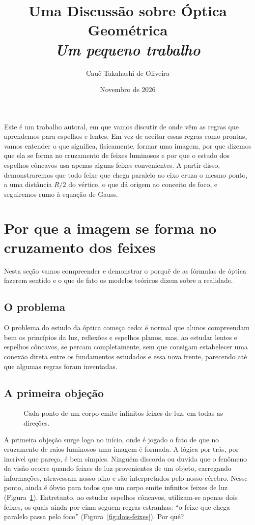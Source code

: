 \documentclass[11pt,a4paper]{article}
\title{\textbf{Uma Discussão sobre Óptica Geométrica}\\[11pt]
  {\large\itshape Um pequeno trabalho}}
\author{Cauê Takahashi de Oliveira}
\date{Novembro de 2026}
\begin{document}
\maketitle
\thispagestyle{empty}

Este é um trabalho autoral, em que vamos discutir de onde vêm as regras que
aprendemos para espelhos e lentes. Em vez de aceitar essas regras como prontas,
vamos entender o que significa, fisicamente, formar uma imagem, por que dizemos
que ela se forma no cruzamento de feixes luminosos e por que o estudo dos
espelhos côncavos usa apenas alguns feixes convenientes. A partir disso,
demonstraremos que todo feixe que chega paralelo ao eixo cruza o mesmo ponto, a
uma distância $R/2$ do vértice, o que dá origem ao conceito de foco, e seguiremos
rumo à equação de Gauss.

\section*{Por que a imagem se forma no cruzamento dos feixes}

Nesta seção vamos compreender e demonstrar o porquê de as fórmulas de óptica
fazerem sentido e o que de fato os modelos teóricos dizem sobre a realidade.

\subsection*{O problema}
O problema do estudo da óptica começa cedo: é normal que
alunos compreendam bem os princípios da luz, reflexões e espelhos planos, mas,
ao estudar lentes e espelhos côncavos, se percam completamente, sem que consigam
estabelecer uma conexão direta entre os fundamentos estudados e essa nova
frente, parecendo até que algumas regras foram inventadas.

\subsection*{A primeira objeção}
\begin{figure}
  \centering
  \vspace{-10pt}
  \begingroup{}%
  \endgroup
  \captionsetup{margin=0pt}
  \caption{Cada ponto de um corpo emite infinitos feixes de luz, em todas as
    direções.}
  \label{fig:ponto}
\end{figure}
A primeira objeção surge logo no início, onde é jogado o
fato de que no cruzamento de raios luminosos uma imagem é formada. A lógica por
trás, por incrível que pareça, é bem simples. Ninguém discorda ou duvida que o
fenômeno da visão ocorre quando feixes de luz provenientes de um objeto,
carregando informações, atravessam nosso olho e são interpretados pelo nosso
cérebro. Nesse ponto, ainda é óbvio para todos que um corpo emite infinitos
feixes de luz (Figura~\ref{fig:ponto}). Entretanto, ao estudar espelhos
côncavos, utilizam-se apenas dois feixes, os quais ainda por cima seguem regras
estranhas: \enquote{o feixe que chega paralelo passa pelo foco}
(Figura~\ref{fig:dois-feixes}). Por quê?
\end{document}

